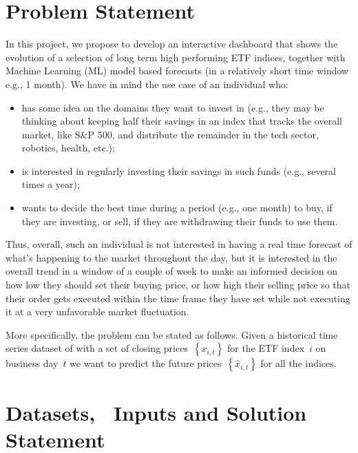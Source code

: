 \documentclass[10pt]{article}
\providecommand{\tightlist}{\setlength{\itemsep}{0pt}\setlength{\parskip}{0pt}}%
\begin{document}
\hypertarget{problem-statement}{%
\section*{Problem Statement}}

{\label{942564}}

In this project, we propose to develop an interactive dashboard that
shows the evolution of a selection of long term high performing ETF
indices, together with Machine Learning (ML) model based forecasts (in a
relatively short time window e.g., 1 month). We have in mind the use
case of an individual who:

\begin{itemize}
\tightlist
\item
  has some idea on the domains they want to invest in (e.g., they may be
  thinking about keeping half their savings in an index that tracks the
  overall market, like S\&P 500, and distribute the remainder in the
  tech sector, robotics, health, etc.);
\item
  is interested in regularly investing their savings in such funds
  (e.g., several times a year);
\item
  wants to decide the best time during a period (e.g., one month) to
  buy, if they are investing, or sell, if they are withdrawing their
  funds to use them.
\end{itemize}

Thus, overall, such an individual is not interested in having a real
time forecast of what's happening to the market throughout the day, but
it is interested in the overall trend in a window of a couple of week to
make an informed decision on how low they should set their buying price,
or how high their selling price so that their order gets executed within
the time frame they have set while not executing it at a very
unfavorable market fluctuation.

More specifically, the problem can be stated as follows. Given a
historical time series dataset of with a set of closing
prices~\(\left\{x_{i,t}\right\}\) for the ETF index~\(i\) on
business day~\(t\) we want to predict the future
prices~\(\left\{\hat{x}_{i, t}\right\}\) for all the indices.~

\hypertarget{datasets-inputs-and-solution-statement}{%
\section*{Datasets,~ Inputs and Solution
Statement}}
\end{document}
